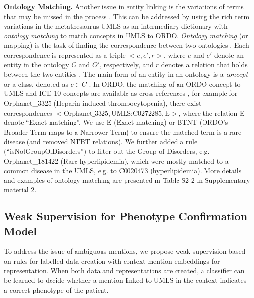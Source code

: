 \documentclass[twocolumn]{bmcart}
\begin{document}
\textbf{Ontology Matching.} Another issue in entity linking is the variations of terms that may be missed in the process \cite{shen2015}. This can be addressed by using the rich term variations in the metathesaurus UMLS as an intermediary dictionary with \emph{ontology matching} to match concepts in UMLS to ORDO. \emph{Ontology matching} (or mapping) is the task of finding the correspondence between two ontologies \cite{noy_ontology_2009}. Each correspondence is represented as a triple $<e, e\prime, r>$, where $e$ and $e\prime$ denote an entity in the ontology $O$ and $O\prime$, respectively, and $r$ denotes a relation that holds between the two entities \cite[p.~43]{euzenat_matching_2013}. The main form of an entity in an ontology is a \textit{concept} or a class, denoted as $c \in C$ \cite[p.~34]{euzenat_matching_2013}. In ORDO, the matching of an ORDO concept to UMLS and ICD-10 concepts are available as cross references \cite{vasant2014ordo}, for example for Orphanet\_3325 (Heparin-induced thrombocytopenia), there exist correspondences $<\text{Orphanet\_3325},\text{UMLS:C0272285},\text{E}>$, where the relation E denote ``Exact matching''. We use E (Exact matching) or BTNT (ORDO's Broader Term maps to a Narrower Term) to ensure the matched term is a rare disease (and removed NTBT relations). We further added a rule (``isNotGroupOfDisorders'') to filter out the Group of Disorders, e.g. Orphanet\_181422 (Rare hyperlipidemia), which were mostly matched to a common disease in the UMLS, e.g. to C0020473 (hyperlipidemia). More details and examples of ontology matching are presented in Table S2-2 in Supplementary material 2.

\subsection*{Weak Supervision for Phenotype Confirmation Model}
To address the issue of ambiguous mentions, we propose weak supervision based on rules for labelled data creation with context mention embeddings for representation. When both data and representations are created, a classifier can be learned to decide whether a mention linked to UMLS in the context indicates a correct phenotype of the patient.
\end{document}
